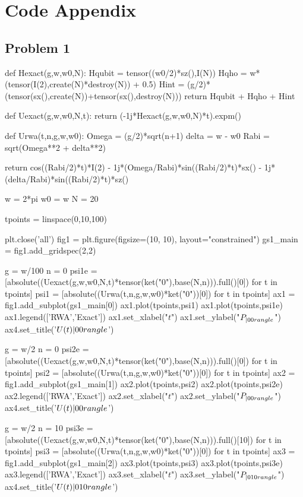 \section*{Code Appendix}
\subsection*{Problem 1}
\begin{python}
def Hexact(g,w,w0,N):
    Hqubit = tensor((w0/2)*sz(),I(N))
    Hqho = w*(tensor(I(2),create(N)*destroy(N)) + 0.5)
    Hint = (g/2)*(tensor(sx(),create(N))+tensor(sx(),destroy(N)))
    return  Hqubit + Hqho + Hint

def Uexact(g,w,w0,N,t):
    return (-1j*Hexact(g,w,w0,N)*t).expm()

def Urwa(t,n,g,w,w0):
    Omega = (g/2)*sqrt(n+1)
    delta = w - w0
    Rabi = sqrt(Omega**2 + delta**2)
    
    return cos((Rabi/2)*t)*I(2) - 1j*(Omega/Rabi)*sin((Rabi/2)*t)*sx() - 1j*(delta/Rabi)*sin((Rabi/2)*t)*sz()

w = 2*pi
w0 = w
N = 20

tpoints = linspace(0,10,100)

plt.close('all')
fig1 = plt.figure(figsize=(10, 10), layout="constrained")
gs1_main = fig1.add_gridspec(2,2)

g = w/100
n = 0
psi1e = [absolute((Uexact(g,w,w0,N,t)*tensor(ket("0"),base(N,n))).full()[0]) for t in tpoints]
psi1 = [absolute((Urwa(t,n,g,w,w0)*ket("0"))[0]) for t in tpoints]
ax1 = fig1.add_subplot(gs1_main[0])
ax1.plot(tpoints,psi1)
ax1.plot(tpoints,psi1e)
ax1.legend(['RWA','Exact'])
ax1.set_xlabel("$t$")
ax1.set_ylabel("$P_{| 00 \\rangle}$")
ax4.set_title('$U(t) | 00 \\rangle$')


g = w/2
n = 0
psi2e = [absolute((Uexact(g,w,w0,N,t)*tensor(ket("0"),base(N,n))).full()[0]) for t in tpoints]
psi2 = [absolute((Urwa(t,n,g,w,w0)*ket("0"))[0]) for t in tpoints]
ax2 = fig1.add_subplot(gs1_main[1])
ax2.plot(tpoints,psi2)
ax2.plot(tpoints,psi2e)
ax2.legend(['RWA','Exact'])
ax2.set_xlabel("$t$")
ax2.set_ylabel("$P_{| 00 \\rangle}$")
ax4.set_title('$U(t) | 00 \\rangle$')


g = w/2
n = 10
psi3e = [absolute((Uexact(g,w,w0,N,t)*tensor(ket("0"),base(N,n))).full()[10]) for t in tpoints]
psi3 = [absolute((Urwa(t,n,g,w,w0)*ket("0"))[0]) for t in tpoints]
ax3 = fig1.add_subplot(gs1_main[2])
ax3.plot(tpoints,psi3)
ax3.plot(tpoints,psi3e)
ax3.legend(['RWA','Exact'])
ax3.set_xlabel("$t$")
ax3.set_ylabel("$P_{| 0 10 \\rangle}$")
ax4.set_title('$U(t) | 010 \\rangle$')



\end{python}
